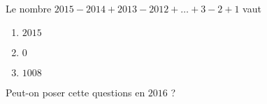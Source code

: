 
\begin{exercice}\label{exo2smath-0015}

Le nombre \( 2015-2014+2013-2012+\ldots +3-2+1\) vaut
\begin{enumerate}
    \item
        \( 2015\)
    \item
        \( 0\)
    \item
        \( 1008\)
\end{enumerate}
Peut-on poser cette questions en \( 2016\) ?

\end{exercice}
